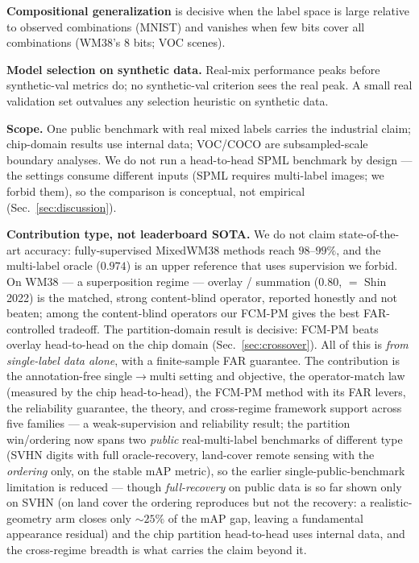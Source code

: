 \documentclass[11pt]{article}
\begin{document}
\textbf{Compositional generalization} is decisive when the label space is
large relative to observed combinations (MNIST) and vanishes when few bits
cover all combinations (WM38's 8 bits; VOC scenes).

\textbf{Model selection on synthetic data.} Real-mix performance peaks
before synthetic-val metrics do; no synthetic-val criterion sees the real
peak. A small real validation set outvalues any selection heuristic on
synthetic data.

\textbf{Scope.} One public benchmark with real mixed labels carries the
industrial claim; chip-domain results use internal data; VOC/COCO are
subsampled-scale boundary analyses. We do not run a head-to-head SPML
benchmark by design --- the settings consume different inputs (SPML requires
multi-label images; we forbid them), so the comparison is conceptual, not
empirical (Sec.~\ref{sec:discussion}).

\textbf{Contribution type, not leaderboard SOTA.} We do not claim
state-of-the-art accuracy: fully-supervised MixedWM38 methods reach $98$--$99\%$, and
the multi-label oracle ($0.974$) is an upper reference that uses supervision we forbid.
On WM38 --- a superposition regime --- overlay / summation ($0.80$, $=$ Shin 2022) is
the matched, strong content-blind operator, reported honestly and not beaten; among the
content-blind operators our FCM-PM gives the best FAR-controlled tradeoff. The
partition-domain result is decisive: FCM-PM beats overlay head-to-head on the chip
domain (Sec.~\ref{sec:crossover}). All of this is \emph{from single-label data alone},
with a finite-sample FAR guarantee. The contribution is the annotation-free
single$\to$multi setting and objective, the operator-match law (measured by the chip
head-to-head), the FCM-PM method with its FAR levers, the reliability guarantee, the
theory, and cross-regime framework support across five families --- a weak-supervision
and reliability result; the partition win/ordering now spans two \emph{public}
real-multi-label benchmarks of different type (SVHN digits with full oracle-recovery,
land-cover remote sensing with the \emph{ordering} only, on the stable mAP metric), so the
earlier single-public-benchmark limitation is reduced --- though \emph{full-recovery} on
public data is so far shown only on SVHN (on land cover the ordering reproduces but not the
recovery: a realistic-geometry arm closes only ${\sim}25\%$ of the mAP gap, leaving a
fundamental appearance residual) and the chip partition head-to-head uses internal data, and the
cross-regime breadth is what carries the claim beyond it.
\end{document}
